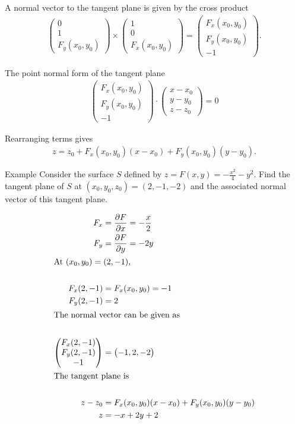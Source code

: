 \documentclass{report}
\newcommand{\cvec}[1]{ \begin{pmatrix} #1 \end{pmatrix} }
\begin{document}
		A normal vector to the tangent plane is given by the cross product
			\begin{align*}
				\cvec{0\\1\\F_y(x_0,y_0)} \times \cvec{1\\0\\F_x(x_0,y_0)} = \cvec{F_x(x_0,y_0)\\F_y(x_0,y_0)\\-1}.
			\end{align*}

		The point normal form of the tangent plane
			\begin{align*}
				\cvec{F_x(x_0,y_0)\\F_y(x_0,y_0)\\-1} \cdot \cvec{x-x_0\\y-y_0\\z-z_0} = 0
			\end{align*}

		Rearranging terms gives
			\begin{align*}
				z = z_0 + F_x(x_0,y_0)(x-x_0) + F_y(x_0,y_0)(y-y_0).
			\end{align*}

		\begin{question}{Example}
			Consider the surface $S$ defined by $z = F(x,y) = -\frac{x^2}{4} - y^2$. Find the tangent plane of $S$ at $(x_0,y_0,z_0) = (2,-1,-2)$ and the associated normal vector of this tangent plane.

			\begin{align*}
				F_x &= \frac{\partial F}{\partial x} = -\frac{x}{2}	\\
				F_y &= \frac{\partial F}{\partial y} = -2y			\\
				\intertext{At $(x_0,y_0) = (2,-1)$, }				\\
				F_x(2,-1) &= F_x(x_0,y_0) = -1						\\
				F_y(2,-1) &= 2										\\
				\intertext{The normal vector can be given as}		\\
				\cvec{F_x(2,-1)\\F_y(2,-1)\\-1} &= \cvec{-1,2,-2}	\\
				\intertext{The tangent plane is}					\\
				z - z_0 &= F_x(x_0,y_0)(x-x_0) + F_y(x_0,y_0)(y-y_0)	\\
				z &= -x + 2y + 2
			\end{align*}
		\end{question}
\end{document}
